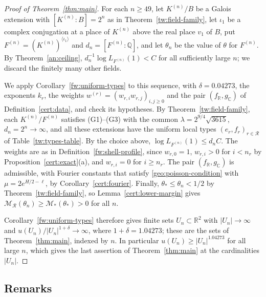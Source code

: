 \documentclass[11pt]{amsart}
\numberwithin{equation}{section}
\theoremstyle{definition}
\theoremstyle{remark}
\newcommand{\Q}{\mathbb Q}
\newcommand{\R}{\mathbb R}
\newcommand{\C}{\mathbb C}
\newcommand{\deltastar}{0.04273}
\begin{document}
\begin{proof}[Proof of Theorem~\ref{thm:main}]
For each $n\ge49$, let $K^{(n)}/B$ be a Galois extension with
$[K^{(n)}:B]=2^n$ as in Theorem~\ref{tw:field-family}, let $\iota_1$ be
a complex conjugation at a place of $K^{(n)}$ above the real place $v_1$
of $B$, put $F^{(n)}=(K^{(n)})^{\langle\iota_1\rangle}$ and
$d_n=[F^{(n)}:\Q]$, and let $\theta_n$ be the value of $\theta$ for
$F^{(n)}$. By Theorem~\ref{an:ceiling}, $d_n^{-1}\log L_{F^{(n)}}(1)<C$
for all sufficiently large $n$; we discard the finitely many other
fields.

We apply Corollary~\ref{fw:uniform-types} to this sequence, with
$\delta=\deltastar$, the exponents $k_r$, the weights
$w^{(r)}=(w_{r,i}w_{r,j})_{i,j\ge0}$ and the pair $(f_\R,g_\C)$ of
Definition~\ref{cert:data}, and check its hypotheses. By
Theorem~\ref{tw:field-family}, each $K^{(n)}/F^{(n)}$ satisfies
(G1)--(G3) with the common $\lambda=2^{9/4}\sqrt{3615}$,
$d_n=2^n\to\infty$, and all these extensions have the uniform local
types $(e_r,f_r)_{r\in\mathcal R}$ of Table~\ref{tw:types-table}. By the
choice above, $\log L_{F^{(n)}}(1)\le d_nC$. The weights are as in
Definition~\ref{fw:shell-profile}, since $w_{r,0}=1$, $w_{r,i}>0$ for
$i<n_r$ by Proposition~\ref{cert:exact}(a), and $w_{r,i}=0$ for $i\ge
n_r$. The pair $(f_\R,g_\C)$ is admissible, with Fourier constants that
satisfy \eqref{geo:poisson-condition} with $\mu=2e^{H/2-\ell}$, by
Corollary~\ref{cert:fourier}. Finally, $\theta_*\le\theta_n<1/2$ by
Theorem~\ref{tw:field-family}, so Lemma~\ref{cert:lower-margin} gives
$\mathcal M_{\mathcal R}(\theta_n)\ge\mathcal M_*(\theta_*)>0$ for all
$n$.

Corollary~\ref{fw:uniform-types} therefore gives finite sets
$U_n\subset\R^2$ with $|U_n|\to\infty$ and
$u(U_n)/|U_n|^{1+\delta}\to\infty$, where $1+\delta=1.04273$; these are
the sets of Theorem~\ref{thm:main}, indexed by $n$. In particular
$u(U_n)\ge|U_n|^{1.04273}$ for all large $n$, which gives the last
assertion of Theorem~\ref{thm:main} at the cardinalities $|U_n|$.
\end{proof}

\subsection{Remarks}
\end{document}
